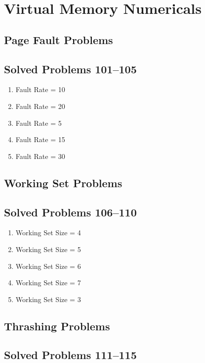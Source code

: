 \section{Virtual Memory Numericals}

\subsection{Page Fault Problems}

\subsection{Solved Problems 101--105}

\begin{enumerate}
\item Fault Rate = 10%
\item Fault Rate = 20%
\item Fault Rate = 5%
\item Fault Rate = 15%
\item Fault Rate = 30%
\end{enumerate}

\subsection{Working Set Problems}

\subsection{Solved Problems 106--110}

\begin{enumerate}
\item Working Set Size = 4
\item Working Set Size = 5
\item Working Set Size = 6
\item Working Set Size = 7
\item Working Set Size = 3
\end{enumerate}

\subsection{Thrashing Problems}

\subsection{Solved Problems 111--115}

